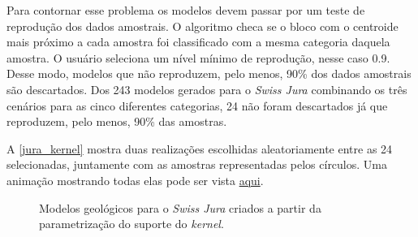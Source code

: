Para contornar esse problema os modelos devem passar por um teste de reprodução dos dados amostrais. O algoritmo checa se o bloco com o centroide mais próximo a cada amostra foi classificado com a mesma categoria daquela amostra. O usuário seleciona um nível mínimo de reprodução, nesse caso 0.9. Desse modo, modelos que não reproduzem, pelo menos, 90\% dos dados amostrais são descartados. Dos 243 modelos gerados para o \textit{Swiss Jura} combinando os três cenários para as cinco diferentes categorias, 24 não foram descartados já que reproduzem, pelo menos, 90\% das amostras. 

A \autoref{jura_kernel} mostra duas realizações escolhidas aleatoriamente entre as 24 selecionadas, juntamente com as amostras representadas pelos círculos. Uma animação mostrando todas elas pode ser vista \href{https://github.com/robertorolo/kernel_support_parametrization_uncertainty_assess/blob/main/ezgif-7-b96e150c9939.gif}{aqui}.

\begin{figure}[H] 
    \centering
    \caption{Modelos geológicos para o \textit{Swiss Jura} criados a partir da parametrização do suporte do \textit{kernel}.} \label{jura_kernel}
     \hspace{1em}
\end{figure}

